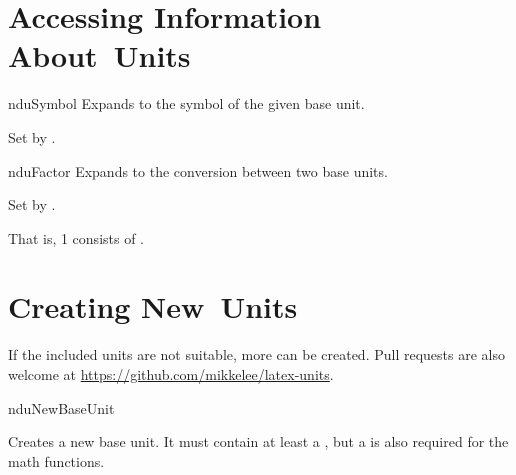 \documentclass[
	a4paper,
	margin=4cm
]{article}
\begin{document}
\clearpage
\section{Accessing Information About Units} %

\begin{docCommand}
	{nduSymbol}
	{}
	Expands to the symbol of the given base unit.
	
	Set by .
\end{docCommand}

\begin{docCommand}
	{nduFactor}
	{}
	Expands to the conversion between two base units.

	Set by .
\begin{dispExample}
That is, 1  consists of
 .
\end{dispExample}
\end{docCommand}

\clearpage
\section{Creating New Units} %

\label{units:new}
If the included units are not suitable, more can be created. Pull requests are also welcome at \url{https://github.com/mikkelee/latex-units}.

\begin{docCommand}
	{nduNewBaseUnit}
	{}
	
Creates a new base unit. It must contain at least a , but a  is also required for the math functions. %

\end{docCommand}
\end{document}
